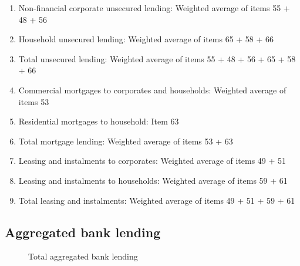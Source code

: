 \documentclass[
  letterpaper,
  DIV=11,
  numbers=noendperiod]{scrartcl}
\providecommand{\tightlist}{%
  \setlength{\itemsep}{0pt}\setlength{\parskip}{0pt}}\usepackage{longtable,booktabs,array}
\begin{document}
\begin{enumerate}
\def\labelenumi{\alph{enumi}.}
\tightlist
\item
  Non-financial corporate unsecured lending: Weighted average of items
  55 + 48 + 56
\item
  Household unsecured lending: Weighted average of items 65 + 58 + 66
\item
  Total unsecured lending: Weighted average of items 55 + 48 + 56 + 65 +
  58 + 66
\item
  Commercial mortgages to corporates and households: Weighted average of
  items 53
\item
  Residential mortgages to household: Item 63
\item
  Total mortgage lending: Weighted average of items 53 + 63
\item
  Leasing and instalments to corporates: Weighted average of items 49 +
  51
\item
  Leasing and instalments to households: Weighted average of items 59 +
  61
\item
  Total leasing and instalments: Weighted average of items 49 + 51 + 59
  + 61
\end{enumerate}

\newpage

\subsection{Aggregated bank lending}\label{aggregated-bank-lending}

\begin{figure}[H]


\caption{\label{fig-bank_lending}Total aggregated bank lending}

\end{figure}%
\end{document}
